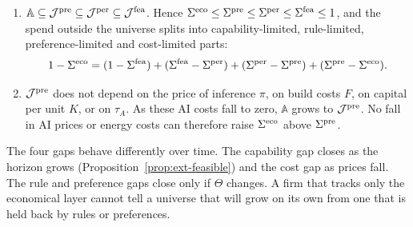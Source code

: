 \begin{lemma}\label{lem:ext-nested}
\begin{enumerate}
\item[(a)] $\mathbb A\subseteq\mathcal J^{\rm pre}\subseteq\mathcal J^{\rm per}\subseteq\mathcal J^{\rm fea}$. Hence $\Sigma^{\rm eco}\le\Sigma^{\rm pre}\le\Sigma^{\rm per}\le\Sigma^{\rm fea}\le1$, and the spend outside the universe splits into capability-limited, rule-limited, preference-limited and cost-limited parts:
\begin{equation}\label{eq:ext-waterfall}
1-\Sigma^{\rm eco}=(1-\Sigma^{\rm fea})+(\Sigma^{\rm fea}-\Sigma^{\rm per})+(\Sigma^{\rm per}-\Sigma^{\rm pre})+(\Sigma^{\rm pre}-\Sigma^{\rm eco}).
\end{equation}
\item[(b)] $\mathcal J^{\rm pre}$ does not depend on the price of inference $\pi$, on build costs $F$, on capital per unit $K$, or on $\tau_A$. As these AI costs fall to zero, $\mathbb A$ grows to $\mathcal J^{\rm pre}$. No fall in AI prices or energy costs can therefore raise $\Sigma^{\rm eco}$ above $\Sigma^{\rm pre}$.
\end{enumerate}
\end{lemma}

The four gaps behave differently over time. The capability gap closes as the horizon grows (Proposition~\ref{prop:ext-feasible}) and the cost gap as prices fall. The rule and preference gaps close only if $\Theta$ changes. A firm that tracks only the economical layer cannot tell a universe that will grow on its own from one that is held back by rules or preferences.

